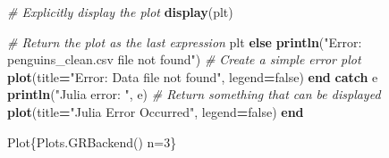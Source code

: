 \documentclass[
  11pt,
]{article}
\newenvironment{Shaded}{\begin{snugshade}}{\end{snugshade}}
\newcommand{\CommentTok}[1]{\textcolor[rgb]{0.56,0.35,0.01}{\textit{#1}}}
\newcommand{\ConstantTok}[1]{\textcolor[rgb]{0.56,0.35,0.01}{#1}}
\newcommand{\ControlFlowTok}[1]{\textcolor[rgb]{0.13,0.29,0.53}{\textbf{#1}}}
\newcommand{\FunctionTok}[1]{\textcolor[rgb]{0.13,0.29,0.53}{\textbf{#1}}}
\newcommand{\NormalTok}[1]{#1}
\newcommand{\OperatorTok}[1]{\textcolor[rgb]{0.81,0.36,0.00}{\textbf{#1}}}
\newcommand{\StringTok}[1]{\textcolor[rgb]{0.31,0.60,0.02}{#1}}
\begin{document}
\begin{Shaded}
\begin{Highlighting}[]
        \CommentTok{\# Explicitly display the plot}
        \FunctionTok{display}\NormalTok{(plt)}
        
        \CommentTok{\# Return the plot as the last expression}
\NormalTok{        plt}
    \ControlFlowTok{else}
        \FunctionTok{println}\NormalTok{(}\StringTok{"Error: penguins\_clean.csv file not found"}\NormalTok{)}
        \CommentTok{\# Create a simple error plot}
        \FunctionTok{plot}\NormalTok{(title}\OperatorTok{=}\StringTok{"Error: Data file not found"}\NormalTok{, legend}\OperatorTok{=}\ConstantTok{false}\NormalTok{)}
    \ControlFlowTok{end}
\ControlFlowTok{catch} \ConstantTok{e}
    \FunctionTok{println}\NormalTok{(}\StringTok{"Julia error: "}\NormalTok{, }\ConstantTok{e}\NormalTok{)}
    \CommentTok{\# Return something that can be displayed}
    \FunctionTok{plot}\NormalTok{(title}\OperatorTok{=}\StringTok{"Julia Error Occurred"}\NormalTok{, legend}\OperatorTok{=}\ConstantTok{false}\NormalTok{)}
\ControlFlowTok{end}
\end{Highlighting}
\end{Shaded}

Plot\{Plots.GRBackend() n=3\}
\end{document}
